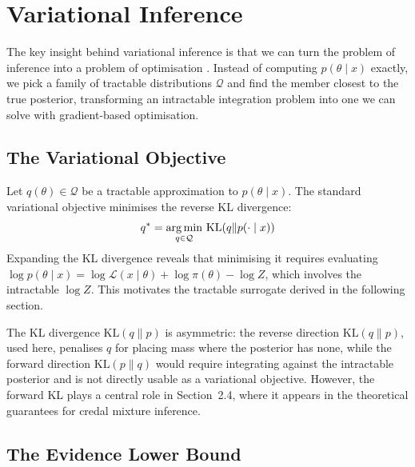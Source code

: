 \section{Variational Inference}

The key insight behind variational inference is that we can turn the problem of inference into a problem of optimisation \citep{blei2017}. Instead of computing $p(\theta \mid x)$ exactly, we pick a family of tractable distributions $\mathcal{Q}$ and find the member closest to the true posterior, transforming an intractable integration problem into one we can solve with gradient-based optimisation.

    \subsection{The Variational Objective}
    Let $q(\theta) \in \mathcal{Q}$ be a tractable approximation to $p(\theta \mid x)$. The standard variational objective minimises the reverse KL divergence:
    \begin{equation}
        q^* = \operatorname*{arg\,min}_{q \in \mathcal{Q}}\, \mathrm{KL}(q \| p(\cdot \mid x))
    \end{equation}
    Expanding the KL divergence reveals that minimising it requires evaluating $\log p(\theta \mid x) = \log \mathcal{L}(x \mid \theta) + \log \pi(\theta) - \log Z$, which involves the intractable $\log Z$. This motivates the tractable surrogate derived in the following section.

    \begin{remark}
    The KL divergence $\mathrm{KL}(q \| p)$ is asymmetric: the reverse direction $\mathrm{KL}(q \| p)$, used here, penalises $q$ for placing mass where the posterior has none, while the forward direction $\mathrm{KL}(p \| q)$ would require integrating against the intractable posterior and is not directly usable as a variational objective. However, the forward KL plays a central role in Section~2.4, where it appears in the theoretical guarantees for credal mixture inference.
    \end{remark}

    \subsection{The Evidence Lower Bound}

